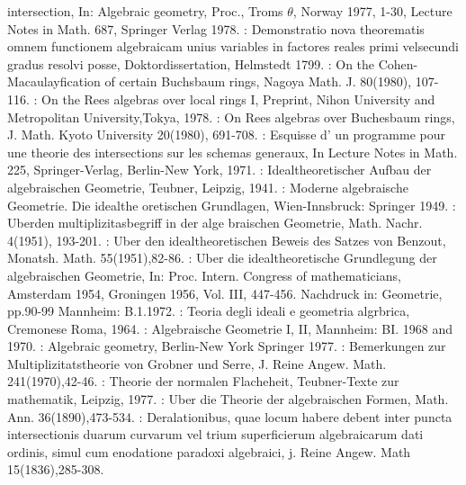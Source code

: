 \begin{thebibliography}{99}
  intersection, In: Algebraic geometry, Proc., Troms $\theta$, Norway
  1977, 1-30, Lecture Notes in Math. 687, Springer Verlag 1978. 
:   Demonstratio nova theorematis omnem
  functionem algebraicam unius variables in factores reales primi
  velsecundi gradus resolvi posse, Doktordissertation, Helmstedt
  1799. 
:  On the Cohen-Macaulayfication of certain
  Buchsbaum rings, Nagoya Math. J. 80(1980), 107-116. 
:   On the Rees algebras over
  local rings I, Preprint, Nihon University and Metropolitan
  University,Tokya, 1978. 
:  On Rees algebras over
  Buchesbaum rings, J. Math. Kyoto University 20(1980), 691-708. 
:  Esquisse d' un programme pour une
  theorie des intersections sur les schemas generaux, In Lecture Notes
  in Math. 225, Springer-Verlag, Berlin-New York, 1971. 
:   Idealtheoretischer Aufbau der
  algebraischen Geometrie, Teubner, Leipzig, 1941. 
:   Moderne algebraische Geometrie. Die
  idealthe oretischen Grundlagen, Wien-Innsbruck: Springer 1949. 
:  Uber\pageoriginale den multiplizitasbegriff in der alge
  braischen Geometrie, Math. Nachr. 4(1951), 193-201. 
:  Uber den idealtheoretischen Beweis des
  Satzes von Benzout, Monatsh. Math. 55(1951),82-86. 
:  Uber die idealtheoretische Grundlegung der
  algebraischen Geometrie, In: Proc. Intern. Congress of
  mathematicians, Amsterdam 1954, Groningen 1956, Vol. III,
  447-456. Nachdruck in:  Geometrie, pp.90-99 Mannheim: B.1.1972.
:   Teoria degli ideali e geometria
  algrbrica, Cremonese Roma, 1964. 
:   Algebraische Geometrie I, II, Mannheim:
  BI. 1968 and 1970. 
:   Algebraic geometry, Berlin-New York
  Springer 1977. 
:  Bemerkungen zur
  Multiplizitatstheorie von Grobner und Serre, J. Reine
  Angew. Math. 241(1970),42-46. 
:  Theorie der
  normalen Flacheheit, Teubner-Texte zur mathematik, Leipzig, 1977. 
:  Uber die Theorie der algebraischen
  Formen, Math. Ann. 36(1890),473-534.  
:  De\pageoriginale ralationibus, quae locum habere
  debent inter puncta intersectionis duarum curvarum vel trium
  superficierum algebraicarum dati ordinis, simul cum enodatione
  paradoxi algebraici, j. Reine Angew. Math 15(1836),285-308. 

\end{thebibliography}
